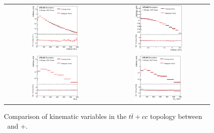 \begin{figure}[p]
\begin{center}
\begin{tabular}{cc}
\includegraphics[width=0.48\textwidth]{Modeling/Figures/defaultcc_tt2cq_q1_pt_norm.eps} &
\includegraphics[width=0.48\textwidth]{Modeling/Figures/defaultcc_tt2cq_q1_eta_norm.eps} \\
\includegraphics[width=0.48\textwidth]{Modeling/Figures/defaultcc_tt2cq_top_pt_norm.eps} &
\includegraphics[width=0.48\textwidth]{Modeling/Figures/defaultcc_tt2cq_ttbar_pt_norm.eps} \\
\end{tabular}
\caption{Comparison of kinematic variables in the $t\bar{t}+cc$ topology between \PP\ and \madgraph+\pythia.}
\label{fig:defaultcc_tt2c}
\end{center}
\end{figure}
